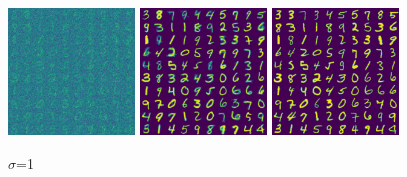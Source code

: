 \documentclass[english]{exercisesheet}
\begin{document}
\begin{solution}
\begin{figure}
 \includegraphics[width=0.3\textwidth]{images/noisy-100.pdf}
 \includegraphics[width=0.3\textwidth]{images/denoised-100-mean.pdf}
 \includegraphics[width=0.3\textwidth]{images/denoised-100-map.pdf}
 \caption{$\sigma$=1}
 \label{s1}
\end{figure}

\end{solution}
\end{document}
